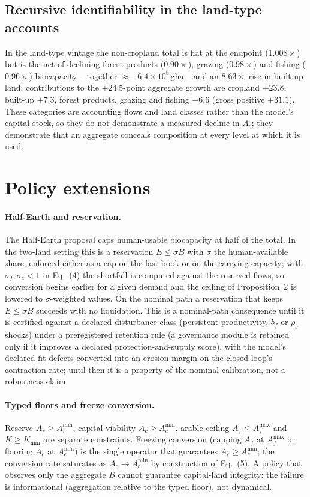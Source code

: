 \documentclass[11pt,a4paper]{article}
\newcommand{\Acmin}{A_c^{\min}}
\begin{document}
\subsection{Recursive identifiability in the land-type accounts}\label{si:recursive}

In the land-type vintage the non-cropland total is flat at the endpoint ($1.008\times$) but is the net of declining forest-products ($0.90\times$), grazing ($0.98\times$) and fishing ($0.96\times$) biocapacity -- together $\approx-6.4\times10^{8}$\,gha -- and an $8.63\times$ rise in built-up land; contributions to the $+24.5$-point aggregate growth are cropland $+23.8$, built-up $+7.3$, forest products, grazing and fishing $-6.6$ (gross positive $+31.1$). These categories are accounting flows and land classes rather than the model's capital stock, so they do not demonstrate a measured decline in $A_c$; they demonstrate that an aggregate conceals composition at every level at which it is used.

\section{Policy extensions}\label{si:policy}

\paragraph{Half-Earth and reservation.} The Half-Earth proposal \citep{Wilson2016} caps human-usable biocapacity at half of the total. In the two-land setting this is a reservation $E\le\sigma B$ with $\sigma$ the human-available share, enforced either as a cap on the fast book or on the carrying capacity; with $\sigma_f,\sigma_c<1$ in Eq.~(4) the shortfall is computed against the reserved flows, so conversion begins earlier for a given demand and the ceiling of Proposition~2 is lowered to $\sigma$-weighted values. On the nominal path a reservation that keeps $E\le\sigma B$ succeeds with no liquidation. This is a nominal-path consequence until it is certified against a declared disturbance class (persistent productivity, $b_f$ or $\rho_c$ shocks) under a preregistered retention rule (a governance module is retained only if it improves a declared protection-and-supply score), with the model's declared fit defects converted into an erosion margin on the closed loop's contraction rate; until then it is a property of the nominal calibration, not a robustness claim.

\paragraph{Typed floors and freeze conversion.} Reserve $A_r\ge A_r^{\min}$, capital viability $A_c\ge\Acmin$, arable ceiling $A_f\le A_f^{\max}$ and $K\ge K_{\min}$ are separate constraints. Freezing conversion (capping $A_f$ at $A_f^{\max}$ or flooring $A_c$ at $\Acmin$) is the single operator that guarantees $A_c\ge\Acmin$; the conversion rate saturates as $A_c\to\Acmin$ by construction of Eq.~(5). A policy that observes only the aggregate $B$ cannot guarantee capital-land integrity: the failure is informational (aggregation relative to the typed floor), not dynamical.
\end{document}
